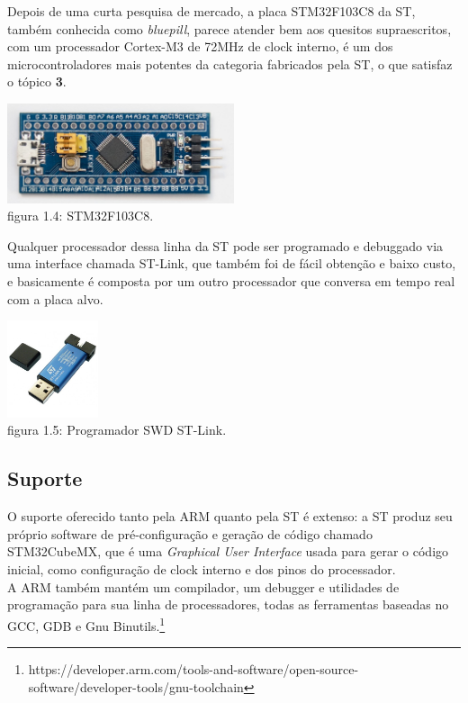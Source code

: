 \documentclass[11pt,a4paper]{report}
\begin{document}
	Depois de uma curta pesquisa de mercado, a placa STM32F103C8 da ST, também conhecida como {\it bluepill}, parece atender bem aos quesitos supraescritos, com um processador Cortex-M3 de 72MHz de clock interno, é um dos microcontroladores mais potentes da categoria fabricados pela ST, o que satisfaz o tópico {\bf 3}.\\
	\begin{center}
		\includegraphics[width=0.5\textwidth]{bluepill}\\
		\footnotesize{figura 1.4: STM32F103C8.}
	\end{center}

	
	Qualquer processador dessa linha da ST pode ser programado e debuggado via uma interface chamada ST-Link, que também foi de fácil obtenção e baixo custo, e basicamente é composta por um outro processador que conversa em tempo real com a placa alvo.
	\begin{center}
	\includegraphics[width=0.2\textwidth]{stlink}\\
	\footnotesize{figura 1.5: Programador SWD ST-Link.}
	\end{center}
	
	\subsection{Suporte}
	O suporte oferecido tanto pela ARM quanto pela ST é extenso: a ST produz seu próprio software de pré-configuração e geração de código chamado STM32CubeMX, que é uma {\it Graphical User Interface} usada para gerar o código inicial, como configuração de clock interno e dos pinos do processador.\\
	
	A ARM também mantém um compilador, um debugger e utilidades de programação para sua linha de processadores, todas as ferramentas baseadas no GCC, GDB e Gnu Binutils.\footnote{https://developer.arm.com/tools-and-software/open-source-software/developer-tools/gnu-toolchain}\\
	
\end{document}
